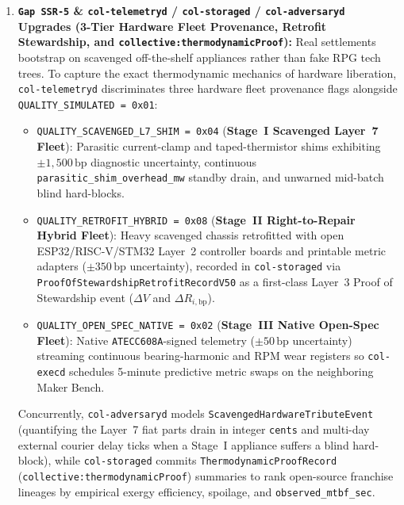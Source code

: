 \begin{enumerate}
  \item \textbf{\texttt{Gap SSR-5} \& \texttt{col-telemetryd} / \texttt{col-storaged} / \texttt{col-adversaryd} Upgrades (3-Tier Hardware Fleet Provenance, Retrofit Stewardship, and \texttt{collective:thermodynamicProof}):}
  Real settlements bootstrap on scavenged off-the-shelf appliances rather than fake RPG tech trees. To capture the exact thermodynamic mechanics of hardware liberation, \texttt{col-telemetryd} discriminates three hardware fleet provenance flags alongside \texttt{QUALITY\_SIMULATED = 0x01}:
  \begin{itemize}
    \item \texttt{QUALITY\_SCAVENGED\_L7\_SHIM = 0x04} (\textbf{Stage~I Scavenged Layer~7 Fleet}): Parasitic current-clamp and taped-thermistor shims exhibiting $\pm 1{,}500\,\mathrm{bp}$ diagnostic uncertainty, continuous \texttt{parasitic\_shim\_overhead\_mw} standby drain, and unwarned mid-batch blind hard-blocks.
    \item \texttt{QUALITY\_RETROFIT\_HYBRID = 0x08} (\textbf{Stage~II Right-to-Repair Hybrid Fleet}): Heavy scavenged chassis retrofitted with open ESP32/RISC-V/STM32 Layer~2 controller boards and printable metric adapters ($\pm 350\,\mathrm{bp}$ uncertainty), recorded in \texttt{col-storaged} via \texttt{ProofOfStewardshipRetrofitRecordV50} as a first-class Layer~3 Proof of Stewardship event ($\Delta V$ and $\Delta R_{i,\mathrm{bp}}$).
    \item \texttt{QUALITY\_OPEN\_SPEC\_NATIVE = 0x02} (\textbf{Stage~III Native Open-Spec Fleet}): Native \texttt{ATECC608A}-signed telemetry ($\pm 50\,\mathrm{bp}$ uncertainty) streaming continuous bearing-harmonic and RPM wear registers so \texttt{col-execd} schedules 5-minute predictive metric swaps on the neighboring Maker Bench.
  \end{itemize}
  Concurrently, \texttt{col-adversaryd} models \texttt{ScavengedHardwareTributeEvent} (quantifying the Layer~7 fiat parts drain in integer \texttt{cents} and multi-day external courier delay ticks when a Stage~I appliance suffers a blind hard-block), while \texttt{col-storaged} commits \texttt{ThermodynamicProofRecord} (\texttt{collective:thermodynamicProof}) summaries to rank open-source franchise lineages by empirical exergy efficiency, spoilage, and \texttt{observed\_mtbf\_sec}.
\end{enumerate}

